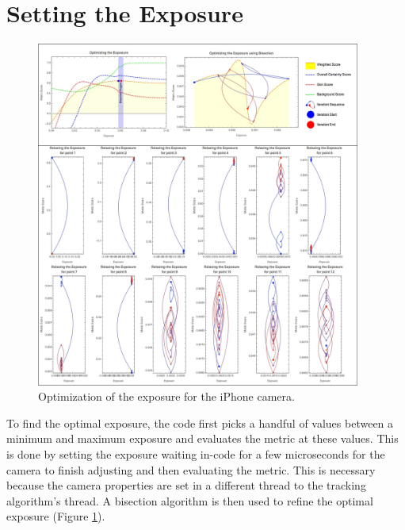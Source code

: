 \section{Setting the Exposure}\label{sec:SettingTheExposure}
\begin{figure}[h!]
  \centering
    \includegraphics[width=0.95\textwidth]{Chapter4/Figs/exposureGraphic1.jpg}
    \caption{Optimization of the exposure for the iPhone camera.}\label{fig:ExposureGraphic1}
\end{figure}
To find the optimal exposure, the code first picks a handful of values between a minimum and maximum exposure and evaluates the metric at these values. This is done by setting the exposure waiting in-code for a few microseconds for the camera to finish adjusting and then evaluating the metric. This is necessary because the camera properties are set in a different thread to the tracking algorithm's thread. A bisection algorithm is then used to refine the optimal exposure (Figure  \ref{fig:ExposureGraphic1}).


